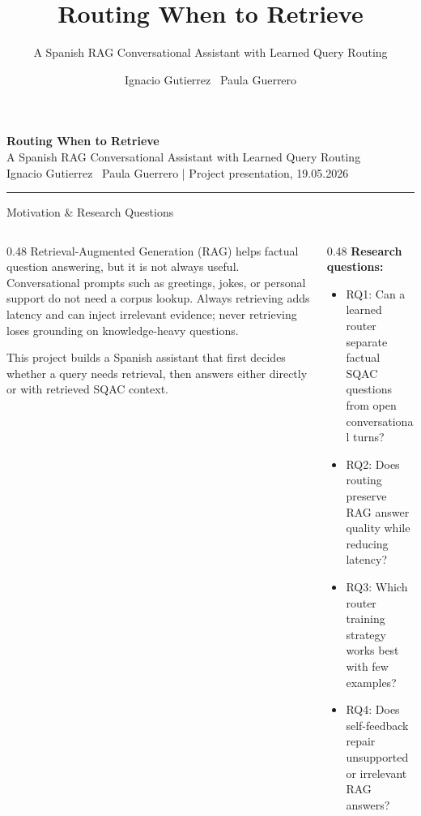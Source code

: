 \documentclass[final]{beamer}
\title{Routing When to Retrieve}
\subtitle{A Spanish RAG Conversational Assistant with Learned Query Routing}
\author{Ignacio Gutierrez \textbullet\ Paula Guerrero}
\institute{Project presentation -- 19.05.2026}
\begin{document}
\begin{frame}[t]

\begin{center}
  {\Huge\bfseries\sffamily Routing When to Retrieve}\\[0.4em]
  {\Large\sffamily A Spanish RAG Conversational Assistant with Learned Query Routing}\\[0.6em]
  {\large\sffamily Ignacio Gutierrez \textbullet\ Paula Guerrero \quad | \quad Project presentation, 19.05.2026}
\end{center}
\vspace{0.5em}
\hrule\vspace{0.8em}

\begin{block}{Motivation \& Research Questions}
\begin{columns}[T,onlytextwidth]

\begin{column}{0.48\textwidth}
  Retrieval-Augmented Generation (RAG) helps factual question answering, but
  it is not always useful. Conversational prompts such as greetings, jokes, or
  personal support do not need a corpus lookup. Always retrieving adds latency
  and can inject irrelevant evidence; never retrieving loses grounding on
  knowledge-heavy questions.

  \vspace{0.5em}
  This project builds a Spanish assistant that first decides whether a query
  needs retrieval, then answers either directly or with retrieved SQAC context.
\end{column}

\begin{column}{0.48\textwidth}
  \textbf{Research questions:}
  \begin{itemize}
    \item RQ1: Can a learned router separate factual SQAC questions from open conversational turns?
    \item RQ2: Does routing preserve RAG answer quality while reducing latency?
    \item RQ3: Which router training strategy works best with few examples?
    \item RQ4: Does self-feedback repair unsupported or irrelevant RAG answers?
  \end{itemize}
\end{column}


\end{columns}
\end{block}
\end{frame}
\end{document}
